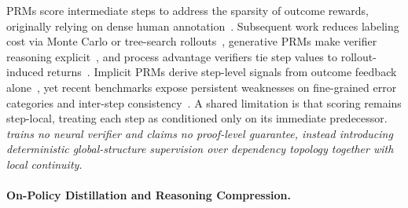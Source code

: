PRMs score intermediate steps to address the sparsity of outcome rewards, originally relying on dense human annotation~\citep{uesato2022solving,lightman2023lets}. Subsequent work reduces labeling cost via Monte Carlo or tree-search rollouts~\citep{wang2024math,luo2024omegaprm,zhang2024rest,lu2024autopsv,zhang2025qwen25mathprm, guan2025com}, generative PRMs make verifier reasoning explicit~\citep{thinkprm2025,genprm2026,she2025rprm}, and process advantage verifiers tie step values to rollout-induced returns~\citep{setlur2025rewarding,lai2024step}. Implicit PRMs derive step-level signals from outcome feedback alone~\citep{yuan2024implicitprm,snell2024com}, yet recent benchmarks expose persistent weaknesses on fine-grained error categories and inter-step consistency~\citep{song2025prmbench,zheng2025processbench}. A shared limitation is that scoring remains step-local, treating each step as conditioned only on its immediate predecessor. \textit{\method trains no neural verifier and claims no proof-level guarantee, instead introducing deterministic global-structure supervision over dependency topology together with local continuity.}


\paragraph{On-Policy Distillation and Reasoning Compression.}

